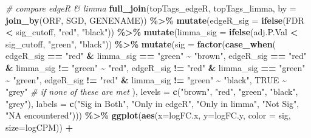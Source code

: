 \documentclass[
]{book}
\newenvironment{Shaded}{\begin{snugshade}}{\end{snugshade}}
\newcommand{\AttributeTok}[1]{\textcolor[rgb]{0.13,0.29,0.53}{#1}}
\newcommand{\CommentTok}[1]{\textcolor[rgb]{0.56,0.35,0.01}{\textit{#1}}}
\newcommand{\ConstantTok}[1]{\textcolor[rgb]{0.56,0.35,0.01}{#1}}
\newcommand{\FunctionTok}[1]{\textcolor[rgb]{0.13,0.29,0.53}{\textbf{#1}}}
\newcommand{\NormalTok}[1]{#1}
\newcommand{\SpecialCharTok}[1]{\textcolor[rgb]{0.81,0.36,0.00}{\textbf{#1}}}
\newcommand{\StringTok}[1]{\textcolor[rgb]{0.31,0.60,0.02}{#1}}
\begin{document}
\begin{Shaded}
\begin{Highlighting}[]
\CommentTok{\# compare edgeR \& limma}
\FunctionTok{full\_join}\NormalTok{(topTags\_edgeR, topTags\_limma,}
          \AttributeTok{by =} \FunctionTok{join\_by}\NormalTok{(ORF, SGD, GENENAME)) }\SpecialCharTok{\%\textgreater{}\%}
  \FunctionTok{mutate}\NormalTok{(}\AttributeTok{edgeR\_sig =} \FunctionTok{ifelse}\NormalTok{(FDR }\SpecialCharTok{\textless{}}\NormalTok{ sig\_cutoff, }\StringTok{"red"}\NormalTok{, }\StringTok{"black"}\NormalTok{)) }\SpecialCharTok{\%\textgreater{}\%}
  \FunctionTok{mutate}\NormalTok{(}\AttributeTok{limma\_sig =} \FunctionTok{ifelse}\NormalTok{(adj.P.Val }\SpecialCharTok{\textless{}}\NormalTok{ sig\_cutoff, }\StringTok{"green"}\NormalTok{, }\StringTok{"black"}\NormalTok{)) }\SpecialCharTok{\%\textgreater{}\%} 
  \FunctionTok{mutate}\NormalTok{(}\AttributeTok{sig =} \FunctionTok{factor}\NormalTok{(}\FunctionTok{case\_when}\NormalTok{(}
\NormalTok{    edgeR\_sig }\SpecialCharTok{==} \StringTok{"red"} \SpecialCharTok{\&}\NormalTok{ limma\_sig }\SpecialCharTok{==} \StringTok{"green"} \SpecialCharTok{\textasciitilde{}} \StringTok{"brown"}\NormalTok{,}
\NormalTok{    edgeR\_sig }\SpecialCharTok{==} \StringTok{"red"} \SpecialCharTok{\&}\NormalTok{ limma\_sig }\SpecialCharTok{!=} \StringTok{"green"} \SpecialCharTok{\textasciitilde{}} \StringTok{"red"}\NormalTok{,}
\NormalTok{    edgeR\_sig }\SpecialCharTok{!=} \StringTok{"red"} \SpecialCharTok{\&}\NormalTok{ limma\_sig }\SpecialCharTok{==} \StringTok{"green"} \SpecialCharTok{\textasciitilde{}} \StringTok{"green"}\NormalTok{,}
\NormalTok{    edgeR\_sig }\SpecialCharTok{!=} \StringTok{"red"} \SpecialCharTok{\&}\NormalTok{ limma\_sig }\SpecialCharTok{!=} \StringTok{"green"} \SpecialCharTok{\textasciitilde{}} \StringTok{"black"}\NormalTok{,}
    \ConstantTok{TRUE} \SpecialCharTok{\textasciitilde{}} \StringTok{"grey"}  \CommentTok{\# if none of these are met}
\NormalTok{  ), }\AttributeTok{levels =} \FunctionTok{c}\NormalTok{(}\StringTok{"brown"}\NormalTok{, }\StringTok{"red"}\NormalTok{, }\StringTok{"green"}\NormalTok{, }\StringTok{"black"}\NormalTok{, }\StringTok{"grey"}\NormalTok{), }\AttributeTok{labels =} \FunctionTok{c}\NormalTok{(}\StringTok{"Sig in Both"}\NormalTok{, }\StringTok{"Only in edgeR"}\NormalTok{, }\StringTok{"Only in limma"}\NormalTok{, }\StringTok{"Not Sig"}\NormalTok{, }\StringTok{"NA encountered"}\NormalTok{))) }\SpecialCharTok{\%\textgreater{}\%}
  \FunctionTok{ggplot}\NormalTok{(}\FunctionTok{aes}\NormalTok{(}\AttributeTok{x=}\NormalTok{logFC.x, }\AttributeTok{y=}\NormalTok{logFC.y, }\AttributeTok{color =}\NormalTok{ sig, }\AttributeTok{size=}\NormalTok{logCPM)) }\SpecialCharTok{+}

\end{Highlighting}
\end{Shaded}
\end{document}
